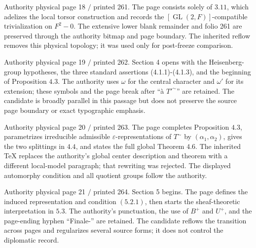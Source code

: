\documentclass[10pt,a4paper]{article}
\begin{document}
\clearpage
{}
\label{d035-physical-018}
\par Authority physical page 18 $/$ printed 261. The page consists solely of $3.11$, which adelizes the local torsor construction and records the $[\operatorname{GL}(2,F)]$-compatible trivialization on $F^2-{0}$. The extensive lower blank remainder and folio 261 are preserved through the authority bitmap and page boundary. The inherited reflow removes this physical topology; it was used only for post-freeze comparison.\par

\clearpage
{}
\label{d035-physical-019}
\par Authority physical page 19 $/$ printed 262. Section 4 opens with the Heisenberg-group hypotheses, the three standard assertions (4.1.1)-(4.1.3), and the beginning of Proposition $4.3$. The authority uses $\omega{}$ for the central character and $\omega{}'$ for its extension; these symbols and the page break after ``à $T'^\sim$'' are retained. The candidate is broadly parallel in this passage but does not preserve the source page boundary or exact typographic emphasis.\par

\clearpage
{}
\label{d035-physical-020}
\par Authority physical page 20 $/$ printed 263. The page completes Proposition $4.3$, parametrizes irreducible admissible $\varepsilon{}$-representations of $T^\sim$ by $(\alpha{}_1,\alpha{}_2)$, gives the two splittings in $4.4$, and states the full global Theorem $4.6$. The inherited TeX replaces the authority's global center description and theorem with a different local-model paragraph; that rewriting was rejected. The displayed automorphy condition and all quotient groups follow the authority.\par

\clearpage
{}
\label{d035-physical-021}
\par Authority physical page 21 $/$ printed 264. Section 5 begins. The page defines the induced representation and condition $(5.2.1)$, then starts the sheaf-theoretic interpretation in $5.3$. The authority's punctuation, the use of $B^+$ and $U^+$, and the page-ending hyphen ``Finale-'' are retained. The candidate reflows the transition across pages and regularizes several source forms; it does not control the diplomatic record.\par
\end{document}
